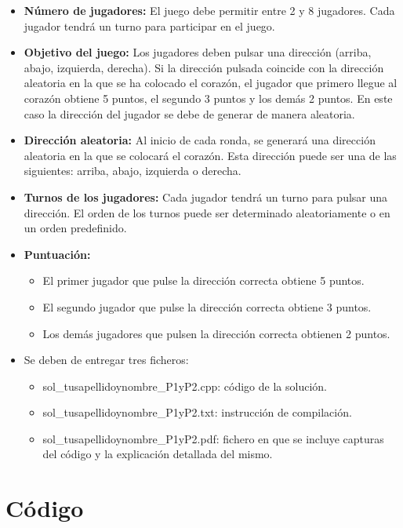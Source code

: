 \documentclass[a4paper,12pt]{article}
\begin{document}
\begin{itemize}
    \item \textbf{Número de jugadores:} El juego debe permitir entre 2 y 8 jugadores. Cada jugador tendrá un turno para participar en el juego.
    \item \textbf{Objetivo del juego:} Los jugadores deben pulsar una dirección (arriba, abajo, izquierda, derecha). Si la dirección pulsada coincide con la dirección aleatoria en la que se ha colocado el corazón, el jugador que primero llegue al corazón obtiene 5 puntos, el segundo 3 puntos y los demás 2 puntos. En este caso la dirección del jugador se debe de generar de manera aleatoria.
    \item \textbf{Dirección aleatoria:} Al inicio de cada ronda, se generará una dirección aleatoria en la que se colocará el corazón. Esta dirección puede ser una de las siguientes: arriba, abajo, izquierda o derecha.
    \item \textbf{Turnos de los jugadores:} Cada jugador tendrá un turno para pulsar una dirección. El orden de los turnos puede ser determinado aleatoriamente o en un orden predefinido.
    \item \textbf{Puntuación:} 
        \begin{itemize}
            \item El primer jugador que pulse la dirección correcta obtiene 5 puntos.
            \item El segundo jugador que pulse la dirección correcta obtiene 3 puntos.
            \item Los demás jugadores que pulsen la dirección correcta obtienen 2 puntos.
        \end{itemize}
    \item Se deben de entregar tres ficheros:
        \begin{itemize}
            \item sol\_tusapellidoynombre\_P1yP2.cpp: código de la solución.
            \item sol\_tusapellidoynombre\_P1yP2.txt: instrucción de compilación.
            \item sol\_tusapellidoynombre\_P1yP2.pdf: fichero en que se incluye capturas del código y la explicación detallada del mismo.
        \end{itemize}
\end{itemize}


\section{Código}

\end{document}
